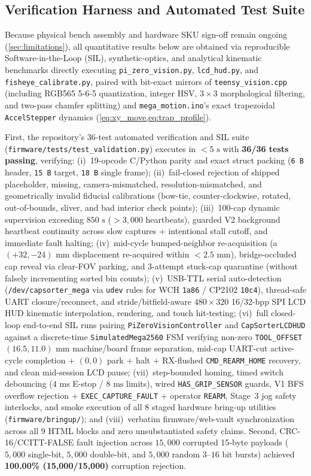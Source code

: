 \documentclass[10pt,twocolumn,letterpaper]{article}
\begin{document}
\subsection{Verification Harness and Automated Test Suite}
Because physical bench assembly and hardware SKU sign-off remain ongoing (\cref{sec:limitations}), all quantitative results below are obtained via reproducible Software-in-the-Loop (SIL), synthetic-optics, and analytical kinematic benchmarks directly executing \texttt{pi\_zero\_vision.py}, \texttt{lcd\_hud.py}, and \texttt{fisheye\_calibrate.py}, paired with bit-exact mirrors of \texttt{teensy\_vision.cpp} (including RGB565 5-6-5 quantization, integer HSV, $3\times 3$ morphological filtering, and two-pass chamfer splitting) and \texttt{mega\_motion.ino}'s exact trapezoidal \texttt{AccelStepper} dynamics (\cref{eq:xy_move,eq:trap_profile}).

First, the repository's 36-test automated verification and SIL suite (\texttt{firmware/tests/test\_validation.py}) executes in $<5\text{ s}$ with \textbf{36/36 tests passing}, verifying: (i)~19-opcode C/Python parity and exact struct packing (\texttt{6\,B} header, \texttt{15\,B} target, \texttt{18\,B} single frame); (ii)~fail-closed rejection of shipped placeholder, missing, camera-mismatched, resolution-mismatched, and geometrically invalid fiducial calibrations (bow-tie, counter-clockwise, rotated, out-of-bounds, sliver, and bad interior check points); (iii)~100-cap dynamic supervision exceeding $850\text{ s}$ ($>3{,}000$ heartbeats), guarded V2 background heartbeat continuity across slow captures + intentional stall cutoff, and immediate fault halting; (iv)~mid-cycle bumped-neighbor re-acquisition (a $(+32,-24)\text{ mm}$ displacement re-acquired within $<2.5\text{ mm}$), bridge-occluded cap reveal via clear-FOV parking, and 3-attempt stuck-cap quarantine (without falsely incrementing sorted bin counts); (v)~USB-TTL serial auto-detection (\texttt{/dev/capsorter\_mega} via \texttt{udev} rules for WCH \texttt{1a86} / CP2102 \texttt{10c4}), thread-safe UART closure/reconnect, and stride/bitfield-aware $480\times 320$ 16/32-bpp SPI LCD HUD kinematic interpolation, rendering, and touch hit-testing; (vi)~full closed-loop end-to-end SIL runs pairing \texttt{PiZeroVisionController} and \texttt{CapSorterLCDHUD} against a discrete-time \texttt{SimulatedMega2560} FSM verifying non-zero \texttt{TOOL\_OFFSET} $(16.5,11.0)\text{ mm}$ machine/board frame separation, mid-cap UART-cut active-cycle completion + $(0,0)$ park + halt + RX-flushed \texttt{CMD\_REARM\_HOME} recovery, and clean mid-session LCD pause; (vii)~step-bounded homing, timed switch debouncing ($4\text{ ms}$ E-stop / $8\text{ ms}$ limits), wired \texttt{HAS\_GRIP\_SENSOR} guards, V1 BFS overflow rejection + \texttt{EXEC\_CAPTURE\_FAULT} + operator \texttt{REARM}, Stage~3 jog safety interlocks, and smoke execution of all 8 staged hardware bring-up utilities (\texttt{firmware/bringup/}); and (viii)~verbatim firmware/web-vault synchronization across all 9 HTML blocks and zero unsubstantiated safety claims. Second, CRC-16/CCITT-FALSE fault injection across $15{,}000$ corrupted 15-byte payloads ($5{,}000$ single-bit, $5{,}000$ double-bit, and $5{,}000$ random $3\text{--}16\text{ bit}$ bursts) achieved \textbf{100.00\% (15,000/15,000)} corruption rejection.
\end{document}
